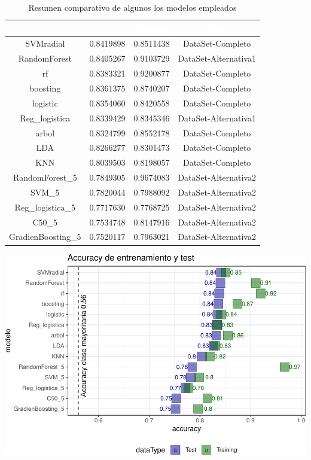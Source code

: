 \documentclass[]{article}
\begin{document}
\begin{table}[!h]

\caption{\label{tab:cuadro_comparativo-modelos}Resumen comparativo de algunos los modelos empleados}
\centering
\begin{tabular}[t]{cccc}
\toprule
\rowcolor{black}  \multicolumn{1}{c}{\textcolor{white}{\textbf{object}}} & \multicolumn{1}{c}{\textcolor{white}{\textbf{Test}}} & \multicolumn{1}{c}{\textcolor{white}{\textbf{Training}}} & \multicolumn{1}{c}{\textcolor{white}{\textbf{dataset}}}\\
\midrule
\rowcolor{gray!6}  SVMradial & 0.8419898 & 0.8511438 & DataSet-Completo\\
RandomForest & 0.8405267 & 0.9103729 & DataSet-Alternativa1\\
\rowcolor{gray!6}  rf & 0.8383321 & 0.9200877 & DataSet-Completo\\
boosting & 0.8361375 & 0.8740207 & DataSet-Completo\\
\rowcolor{gray!6}  logistic & 0.8354060 & 0.8420558 & DataSet-Completo\\
\addlinespace
Reg\_logistica & 0.8339429 & 0.8345346 & DataSet-Alternativa1\\
\rowcolor{gray!6}  arbol & 0.8324799 & 0.8552178 & DataSet-Completo\\
LDA & 0.8266277 & 0.8301473 & DataSet-Completo\\
\rowcolor{gray!6}  KNN & 0.8039503 & 0.8198057 & DataSet-Completo\\
RandomForest\_5 & 0.7849305 & 0.9674083 & DataSet-Alternativa2\\
\addlinespace
\rowcolor{gray!6}  SVM\_5 & 0.7820044 & 0.7988092 & DataSet-Alternativa2\\
Reg\_logistica\_5 & 0.7717630 & 0.7768725 & DataSet-Alternativa2\\
\rowcolor{gray!6}  C50\_5 & 0.7534748 & 0.8147916 & DataSet-Alternativa2\\
GradienBoosting\_5 & 0.7520117 & 0.7963021 & DataSet-Alternativa2\\
\bottomrule
\end{tabular}
\end{table}

\includegraphics{Comparativo_modelos_files/figure-latex/unnamed-chunk-10-1.pdf}
\end{document}
